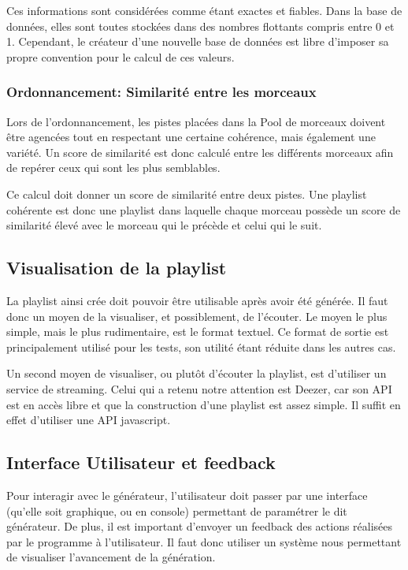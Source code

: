 Ces informations sont considérées comme étant exactes et fiables. Dans la base 
de données, elles sont toutes stockées dans des nombres flottants compris entre 
0 et 1. Cependant, le créateur d'une nouvelle base de données est libre 
d'imposer sa propre convention pour le calcul de ces valeurs.

\subsubsection{Ordonnancement: Similarité entre les morceaux}
\label{besoins:fonc:generation:selection:ordonnancement}

Lors de l'ordonnancement, les pistes placées dans la Pool de morceaux doivent 
être agencées tout en respectant une certaine cohérence, mais également une 
variété. Un score de similarité est donc calculé entre les différents morceaux 
afin de repérer ceux qui sont les plus semblables.

Ce calcul doit donner un score de similarité entre deux pistes. Une playlist 
cohérente est donc une playlist dans laquelle chaque morceau possède un score 
de similarité élevé avec le morceau qui le précède et celui qui le suit.

\subsection{Visualisation de la playlist}
\label{besoins:fonc:generation:visu}

La playlist ainsi crée doit pouvoir être utilisable après avoir été générée. 
Il faut donc un moyen de la visualiser, et possiblement, de l’écouter. Le 
moyen le plus simple, mais le plus rudimentaire, est le format textuel. Ce 
format de sortie est principalement utilisé pour les tests, son utilité étant 
réduite dans les autres cas.

Un second moyen de visualiser, ou plutôt d'écouter la playlist, est d’utiliser 
un service de streaming. Celui qui a retenu notre attention est Deezer, car son 
API est en accès libre et que la construction d'une playlist est assez simple. 
Il suffit en effet d’utiliser une API javascript.
        
\subsection{Interface Utilisateur et feedback}
\label{besoins:fonc:generation:feedback}

Pour interagir avec le générateur, l’utilisateur doit passer par une interface 
(qu'elle soit graphique, ou en console) permettant de paramétrer le dit 
générateur. De plus, il est important d’envoyer un feedback des actions 
réalisées par le programme à l’utilisateur. Il faut donc utiliser un système 
nous permettant de visualiser l’avancement de la génération.

